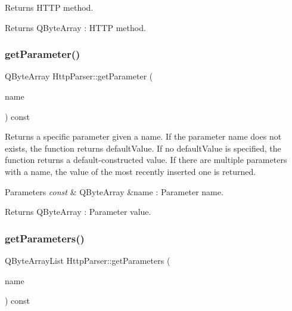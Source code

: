 Returns H\+T\+TP method. 

\begin{DoxyReturn}{Returns}
Q\+Byte\+Array \+: H\+T\+TP method. 
\end{DoxyReturn}
\mbox{\label{class_http_parser_a69fb981ff2f60058277c51b674006663}} 
\subsubsection{\texorpdfstring{get\+Parameter()}{getParameter()}}
{\footnotesize\ttfamily Q\+Byte\+Array Http\+Parser\+::get\+Parameter (\begin{DoxyParamCaption}\item[{const Q\+Byte\+Array \&}]{name }\end{DoxyParamCaption}) const}



Returns a specific parameter given a name. If the parameter name does not exists, the function returns default\+Value. If no default\+Value is specified, the function returns a default-\/constructed value. If there are multiple parameters with a name, the value of the most recently inserted one is returned. 


\begin{DoxyParams}{Parameters}
{\em const} & Q\+Byte\+Array \&name \+: Parameter name. \\
\hline
\end{DoxyParams}
\begin{DoxyReturn}{Returns}
Q\+Byte\+Array \+: Parameter value. 
\end{DoxyReturn}
\mbox{\label{class_http_parser_ab0bb302010df956a954fada3061f59f0}} 
\subsubsection{\texorpdfstring{get\+Parameters()}{getParameters()}\hspace{0.1cm}{\footnotesize\ttfamily [1/2]}}
{\footnotesize\ttfamily Q\+Byte\+Array\+List Http\+Parser\+::get\+Parameters (\begin{DoxyParamCaption}\item[{const Q\+Byte\+Array \&}]{name }\end{DoxyParamCaption}) const}



